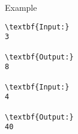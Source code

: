 Example
\begin{verbatim}
\textbf{Input:}
3

\textbf{Output:}
8

\textbf{Input:}
4

\textbf{Output:}
40\end{verbatim}

 